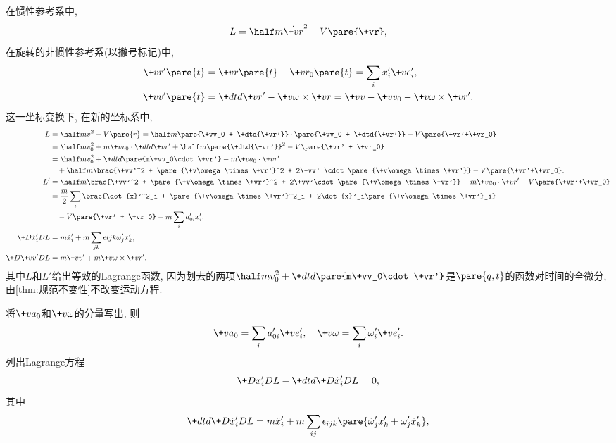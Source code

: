 \documentclass{ctexart}
\begin{document}
\begin{sample}
    \begin{ex}
        在惯性参考系中,
        \[ L = \half m\dot{\+vr}^2 - V\pare{\+vr}, \]
        在旋转的非惯性参考系(以撇号标记)中,
        \begin{align*}
            \+vr'\pare{t} &= \+vr\pare{t} - \+vr_0\pare{t} = \sum_i x'_i\+ve'_i ,\\
            \+vv'\pare{t} &= \+dtd{\+vr'} - \+v\omega\times\+vr = \+vv - \+vv_0 - \+v\omega\times\+vr'.
        \end{align*}
        这一坐标变换下, 在新的坐标系中,
        \begin{align*}
            L &= \half mv^2 - V\pare{r} = \half m\pare{\+vv_0 + \+dtd{\+vr'}}\cdot\pare{\+vv_0 + \+dtd{\+vr'}} - V\pare{\+vr'+\+vr_0} \\
            &= \half mv_0^2 + m\+vv_0\cdot\+dtd{\+vr'} + \half m\pare{\+dtd{\+vr'}}^2 - V\pare{\+vr' + \+vr_0} \\
            &= \half mv_0^2 + \+dtd{}\pare{m\+vv_0\cdot\+vr'} - m\+va_0\cdot\+vr' \\
            &\phantom{=}\, + \half m\brac{\+vv'^2 + \pare{\+v\omega\times\+vr'}^2 + 2\+vv' \cdot\pare{\+v\omega\times\+vr'}} - V\pare{\+vr'+\+vr_0}. \\
            L' &= \half m \brac{\+vv'^2 + \pare{\+v\omega\times\+vr'}^2 + 2\+vv'\cdot\pare{\+v\omega\times\+vr'}} - m\+va_0\cdot\+vr' - V\pare{\+vr'+\+vr_0} \\
            &= \frac{m}{2}\sum_i\brac{\dot{x}'^2_i + \pare{\+v\omega\times\+vr'}^2_i + 2\dot{x}'_i\pare{\+v\omega\times\+vr'}_i}\\
            &\phantom{=}\, - V\pare{\+vr' + \+vr_0} - m\sum_i a'_{0i}x'_i. \\
            \+D{\dot{x}'_i}DL &= m\dot{x}'_i + m\sum_{jk} \epsilon{ijk}\omega'_j x'_k, \\
            \+D{\+vv'}DL &= m\+vv' + m\+v\omega\times\+vr'.
        \end{align*}
        其中$L$和$L'$给出等效的Lagrange函数, 因为划去的两项$\displaystyle \half mv_0^2 + \+dtd{}\pare{m\+vv_0\cdot\+vr'}$是$\pare{q,t}$的函数对时间的全微分, 由\cref{thm:规范不变性}不改变运动方程.
        \par
        将$\+va_0$和$\+v\omega$的分量写出, 则
        \[ \+va_0 = \sum_i a'_{0i}\+ve'_i,\quad \+v\omega = \sum_i \omega'_i \+ve'_i. \]
        列出Lagrange方程
        \[ \+D{x'_i}DL - \+dtd{} \+D{\dot{x}'_i}DL = 0, \]
        其中
        \[ \+dtd{} \+D{\dot{x}'_i}DL = m\ddot{x}'_i + m\sum_{ij}\epsilon_{ijk}\pare{\dot{\omega}'_jx'_k + \omega'_j \dot{x}'_k}, \]

\end{ex}
\end{sample}
\end{document}

